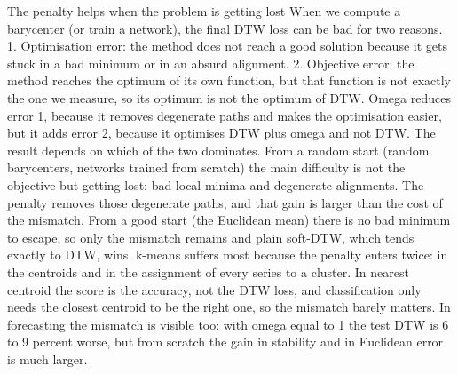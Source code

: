 \documentclass[aspectratio=169,11pt]{beamer}
\begin{document}
\begin{frame}{The penalty helps when the problem is getting lost}
{When we compute a barycenter (or train a network), the final DTW loss can be bad for two reasons. 1. Optimisation error: the method does not reach a good solution because it gets stuck in a bad minimum or in an absurd alignment. 2. Objective error: the method reaches the optimum of its own function, but that function is not exactly the one we measure, so its optimum is not the optimum of DTW. Omega reduces error 1, because it removes degenerate paths and makes the optimisation easier, but it adds error 2, because it optimises DTW plus omega and not DTW. The result depends on which of the two dominates. From a random start (random barycenters, networks trained from scratch) the main difficulty is not the objective but getting lost: bad local minima and degenerate alignments. The penalty removes those degenerate paths, and that gain is larger than the cost of the mismatch. From a good start (the Euclidean mean) there is no bad minimum to escape, so only the mismatch remains and plain soft-DTW, which tends exactly to DTW, wins. k-means suffers most because the penalty enters twice: in the centroids and in the assignment of every series to a cluster. In nearest centroid the score is the accuracy, not the DTW loss, and classification only needs the closest centroid to be the right one, so the mismatch barely matters. In forecasting the mismatch is visible too: with omega equal to 1 the test DTW is 6 to 9 percent worse, but from scratch the gain in stability and in Euclidean error is much larger.}
\end{frame}

\end{document}
